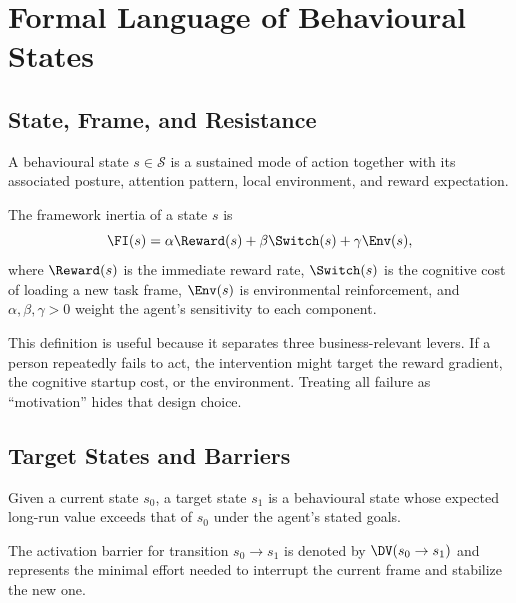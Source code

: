 \chapter{Formal Language of Behavioural States}
\label{ch:formal-language}

\section{State, Frame, and Resistance}

\begin{definition}
A behavioural state $s \in \mathcal{S}$ is a sustained mode of action together
with its associated posture, attention pattern, local environment, and reward
expectation.
\end{definition}

\begin{definition}
The framework inertia of a state $s$ is
\[
  \FI(s) = \alpha \Reward(s) + \beta \Switch(s) + \gamma \Env(s),
\]
where $\Reward(s)$ is the immediate reward rate, $\Switch(s)$ is the cognitive
cost of loading a new task frame, $\Env(s)$ is environmental reinforcement,
and $\alpha, \beta, \gamma > 0$ weight the agent's sensitivity to each
component.
\end{definition}

\begin{remark}
This definition is useful because it separates three business-relevant levers.
If a person repeatedly fails to act, the intervention might target the reward
gradient, the cognitive startup cost, or the environment. Treating all failure
as ``motivation'' hides that design choice.
\end{remark}

\section{Target States and Barriers}

\begin{definition}
Given a current state $s_0$, a target state $s_1$ is a behavioural state whose
expected long-run value exceeds that of $s_0$ under the agent's stated goals.
\end{definition}

\begin{definition}
The activation barrier for transition $s_0 \to s_1$ is denoted by
$\DV(s_0 \to s_1)$ and represents the minimal effort needed to interrupt the
current frame and stabilize the new one.
\end{definition}

